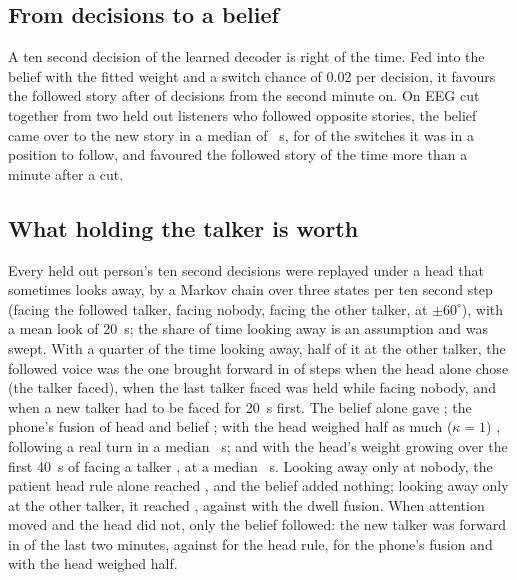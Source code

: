 \subsection{From decisions to a belief}
\label{sec:belief}

A ten second decision of the learned decoder is right \nnTen{} of the time. Fed into the belief with the fitted weight and a switch chance of 0.02 per decision, it favours the followed story after \beliefSteady{} of decisions from the second minute on. On EEG cut together from two held out listeners who followed opposite stories, the belief came over to the new story in a median of \spliceMedian~s, for \spliceFollowed{} of the switches it was in a position to follow, and favoured the followed story \spliceSteady{} of the time more than a minute after a cut.

\subsection{What holding the talker is worth}
\label{sec:hold}

Every held out person's ten second decisions were replayed under a head that sometimes looks away, by a Markov chain over three states per ten second step (facing the followed talker, facing nobody, facing the other talker, at $\pm60^\circ$), with a mean look of 20~s; the share of time looking away is an assumption and was swept. With a quarter of the time looking away, half of it at the other talker, the followed voice was the one brought forward in \holdFace{} of steps when the head alone chose (the talker faced), \holdHold{} when the last talker faced was held while facing nobody, and \holdHeadDwell{} when a new talker had to be faced for 20~s first. The belief alone gave \holdEeg{}; the phone's fusion of head and belief \holdFused{}; with the head weighed half as much ($\kappa=1$) \holdFusedKOne{}, following a real turn in a median \holdSwitchTookKOne~s; and with the head's weight growing over the first 40~s of facing a talker \holdFusedDwell{}, at a median \holdSwitchTook~s. Looking away only at nobody, the patient head rule alone reached \holdNobodyHeadDwell{}, and the belief added nothing; looking away only at the other talker, it reached \holdOtherHeadDwell{}, against \holdOtherFusedDwell{} with the dwell fusion. When attention moved and the head did not, only the belief followed: the new talker was forward in \holdCovertEeg{} of the last two minutes, against \holdCovertHeadDwell{} for the head rule, \holdCovertFused{} for the phone's fusion and \holdCovertFusedKOne{} with the head weighed half.

